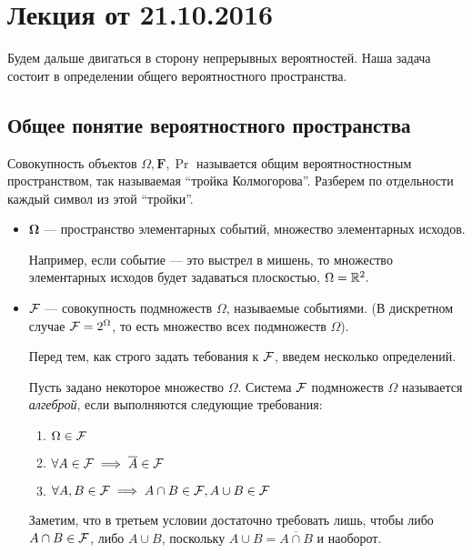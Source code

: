 \section{Лекция от 21.10.2016}

Будем дальше двигаться в сторону непрерывных вероятностей. Наша задача состоит в определении общего вероятностного пространства.

\subsection{Общее понятие вероятностного пространства}
Совокупность объектов \(\Omega, \mathbf{F}, \Pr \) называется общим вероятностностным пространством, так называемая ``тройка Колмогорова''.
Разберем по отдельности каждый символ из этой ``тройки''.
\begin{itemize}
	\item $\mathbf{\Omega}$ --- пространство элементарных событий, множество элементарных исходов.
    
	Например, если событие --- это выстрел в мишень, то множество элементарных исходов будет задаваться плоскостью, \(\Omega = \mathbb{R}^2. \)
	
	\item $\mathcal{F}$ --- совокупность подмножеств $\Omega$, называемые событиями. (В дискретном случае $\mathcal{F} = 2^{\Omega}$, то есть множество всех подмножеств $ \Omega $).
    
    Перед тем, как строго задать тебования к $ \mathcal{F} $, введем несколько определений.
    
        \begin{definition} 
            Пусть задано некоторое множество $ \Omega $. Система $ \mathcal{F} $ подмножеств $ \Omega $ называется \emph{алгеброй}, если выполняются следующие требования:
            
            
            \begin{enumerate}
                \item \( \Omega \in \mathcal{F} \)
                
                \item \( \forall A \in \mathcal{F} \implies \overline{A} \in \mathcal{F} \)
                
                \item \( \forall A, B \in \mathcal{F} \implies A \cap B \in \mathcal{F}, A \cup B \in \mathcal{F} \)
            \end{enumerate}
            Заметим, что в третьем условии достаточно требовать лишь, чтобы либо \(A \cap B \in \mathcal{F}\), либо \(A \cup B\), поскольку \(A \cup B = \overline {A \cap B}\) и наоборот. 
            

\end{definition}
\end{itemize}
